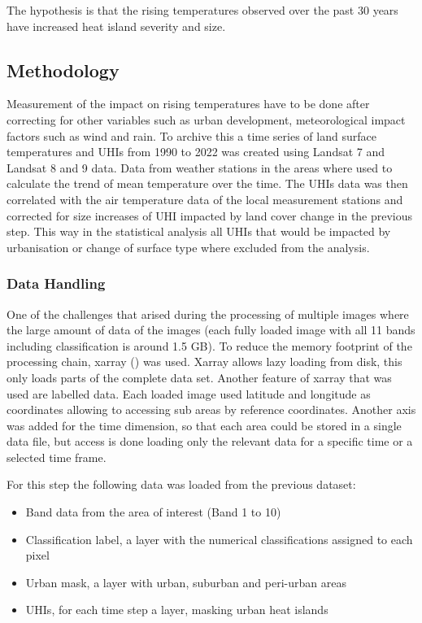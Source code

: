 \documentclass[12pt,a4paper, english]{article}
\begin{document}
       The hypothesis is that the rising temperatures observed over the past 30 years have increased heat island severity and size. 
    \subsection{Methodology}
      Measurement of the impact on rising temperatures have to be done after correcting for other variables such as urban development, meteorological impact factors such as wind and rain. 
      To archive this a time series of land surface temperatures and \glspl{UHI} from 1990 to 2022 was created using Landsat 7 and Landsat 8 and 9 data.
      Data from weather stations in the areas where used to calculate the trend of mean temperature over the time. 
      The \glspl{UHI} data was then correlated with the air temperature data of the local measurement stations and corrected for size increases of \gls{UHI} impacted by land cover change in the previous step. 
      This way in the statistical analysis all \glspl{UHI} that would be impacted by urbanisation or change of surface type where excluded from the analysis.
    \subsubsection{Data Handling}
      One of the challenges that arised during the processing of multiple images where the large amount of data of the images (each fully loaded image with all 11 bands including classification is around 1.5 GB).
      To reduce the memory footprint of the processing chain, xarray (\autocite{hoyer2017xarray}) was used. 
      Xarray allows lazy loading from disk, this only loads parts of the complete data set. 
      Another feature of xarray that was used are labelled data. Each loaded image used latitude and longitude as coordinates allowing to accessing sub areas by reference coordinates. 
      Another axis was added for the time dimension, so that each area could be stored in a single data file, but access is done loading only the relevant data for a specific time or a selected time frame.
  
      For this step the following data was loaded from the previous dataset: 
      \begin{itemize}
        \item Band data from the area of interest (Band 1 to 10)
        \item Classification label, a layer with the numerical classifications assigned to each pixel 
        \item Urban mask, a layer with urban, suburban and peri-urban areas
        \item \glspl{UHI}, for each time step a layer, masking urban heat islands
      \end{itemize}
\end{document}
